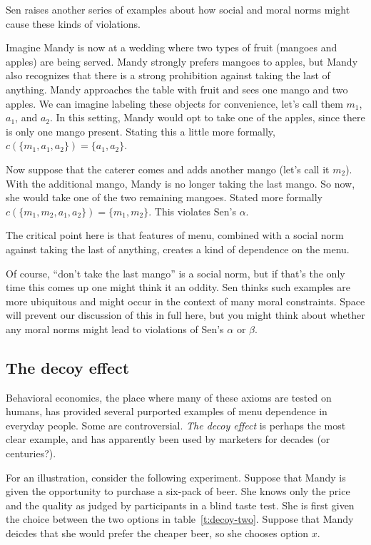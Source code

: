 Sen raises another series of examples about how social and moral norms might cause these kinds of violations.

Imagine Mandy is now at a wedding where two types of fruit (mangoes and apples) are being served.  Mandy strongly prefers mangoes to apples, but Mandy also recognizes that there is a strong prohibition against taking the last of anything.  Mandy approaches the table with fruit and sees one mango and two apples.  We can imagine labeling these objects for convenience, let's call them $m_1$, $a_1$, and $a_2$.  In this setting, Mandy would opt to take one of the apples, since there is only one mango present. Stating this a little more formally, $c(\{m_1, a_1, a_2\}) = \{a_1, a_2\}$.

Now suppose that the caterer comes and adds another mango (let's call it $m_2$).  With the additional mango, Mandy is no longer taking the last mango.  So now, she would take one of the two remaining mangoes.  Stated more formally $c(\{m_1, m_2, a_1, a_2\}) = \{m_1, m_2\}$.  This violates Sen's $\alpha$.

The critical point here is that features of menu, combined with a social norm against taking the last of anything, creates a kind of dependence on the menu.  

Of course, ``don't take the last mango'' is a social norm, but if that's the only time this comes up one might think it an oddity. Sen thinks such examples are more ubiquitous and might occur in the context of many moral constraints.  Space will prevent our discussion of this in full here, but you might think about whether any moral norms might lead to violations of Sen's $\alpha$ or $\beta$.

\subsection{The decoy effect}

Behavioral economics, the place where many of these axioms are tested on humans, has provided several purported examples of menu dependence in everyday people. Some are controversial. {\it The decoy effect} is perhaps the most clear example, and has apparently been used by marketers for decades (or centuries?).

For an illustration, consider the following experiment.  Suppose that Mandy is given the opportunity to purchase a six-pack of beer. She knows only the price and the quality as judged by participants in a blind taste test.  She is first given the choice between the two options in table~\ref{t:decoy-two}.  Suppose that Mandy deicdes that she would prefer the cheaper beer, so she chooses option $x$.

